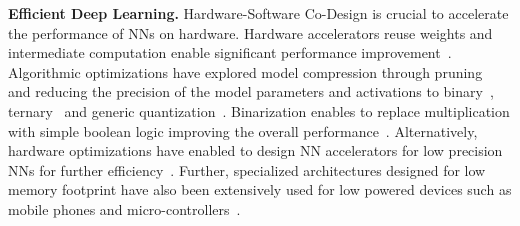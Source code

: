 \noindent\textbf{Efficient Deep Learning.} Hardware-Software Co-Design is crucial to accelerate the performance of NNs on hardware.
Hardware accelerators reuse weights and intermediate computation enable significant performance improvement~\cite{7551407,10.1109/ISCA.2016.30}.
Algorithmic optimizations have explored model compression through pruning~\cite{Han:2015:LBW:2969239.2969366} and reducing the precision of the model parameters and activations to binary~\cite{NIPS2015_5647, NIPS2016_6573}, ternary~\cite{Li2016TernaryWN,DBLP:journals/corr/ZhuHMD16} and generic quantization~\cite{Hubara:2017:QNN:3122009.3242044}.
Binarization enables to replace multiplication with simple boolean logic improving the overall performance~\cite{rastegari2016xnornet,DBLP:journals/corr/ZhouNZWWZ16}.
Alternatively, hardware optimizations have enabled to design NN accelerators for low precision NNs for further efficiency~\cite{AndCav2016YodaNN,Umuroglu2017FINNAF}.
Further, specialized architectures designed for low memory footprint have also been extensively used for low powered devices such as mobile phones and micro-controllers~\cite{DBLP:journals/corr/IandolaMAHDK16,conf/cvpr/SandlerHZZC18}. 
